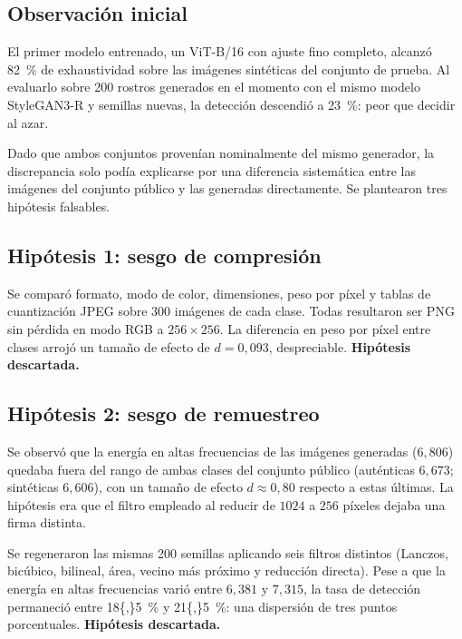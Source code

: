\documentclass[10pt,twocolumn,letterpaper]{article}
\begin{document}
\subsection{Observación inicial}

El primer modelo entrenado, un ViT-B/16 con ajuste fino completo, alcanzó
\SI{82}{\percent} de exhaustividad sobre las imágenes sintéticas del
conjunto de prueba. Al evaluarlo sobre \num{200} rostros generados en el
momento con el mismo modelo StyleGAN3-R y semillas nuevas, la detección
descendió a \SI{23}{\percent}: peor que decidir al azar.

Dado que ambos conjuntos provenían nominalmente del mismo generador, la
discrepancia solo podía explicarse por una diferencia sistemática entre las
imágenes del conjunto público y las generadas directamente. Se plantearon
tres hipótesis falsables.

\subsection{Hipótesis 1: sesgo de compresión}

Se comparó formato, modo de color, dimensiones, peso por píxel y tablas de
cuantización JPEG sobre \num{300} imágenes de cada clase. Todas resultaron
ser PNG sin pérdida en modo RGB a $256\times256$. La diferencia en peso por
píxel entre clases arrojó un tamaño de efecto de $d=0{,}093$, despreciable.
\textbf{Hipótesis descartada.}

\subsection{Hipótesis 2: sesgo de remuestreo}

Se observó que la energía en altas frecuencias de las imágenes generadas
($6{,}806$) quedaba fuera del rango de ambas clases del conjunto público
(auténticas $6{,}673$; sintéticas $6{,}606$), con un tamaño de efecto
$d\approx0{,}80$ respecto a estas últimas. La hipótesis era que el filtro
empleado al reducir de $1024$ a $256$ píxeles dejaba una firma distinta.

Se regeneraron las mismas \num{200} semillas aplicando seis filtros
distintos (Lanczos, bicúbico, bilineal, área, vecino más próximo y
reducción directa). Pese a que la energía en altas frecuencias varió entre
$6{,}381$ y $7{,}315$, la tasa de detección permaneció entre
\SI{18{,}5}{\percent} y \SI{21{,}5}{\percent}: una dispersión de tres puntos
porcentuales. \textbf{Hipótesis descartada.}
\end{document}
